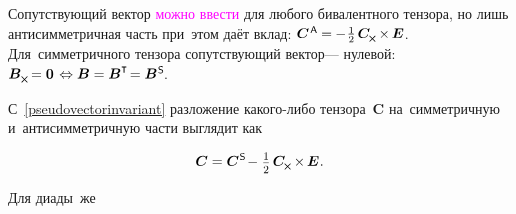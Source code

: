 \begin{otherlanguage}{russian}
\vspace{-0.6em} Сопутствующий вектор \textcolor{magenta}{можно ввести} для любого бивалентного тензора, но лишь антисимметричная часть при~этом даёт вклад: ${\bm{C}^{\hspace{.2ex}\mathsf{A}} \hspace{-0.1ex} = \hspace{-0.1ex} - \hspace{.1ex}\onehalf\hspace{.32ex} \bm{C}_{\hspace{-0.1ex}\Xcompanion} \hspace{-0.16ex} \times \hspace{-0.16ex} \bm{E}}$. Для~симметричного тензора сопутствующий вектор\:--- нулевой: ${\bm{B}_{\Xcompanion} \hspace{-0.25ex} = \bm{0} \hspace{.25ex} \Leftrightarrow \bm{B} = \bm{B}^{\T} \hspace{-0.32ex} = \bm{B}^{\mathsf{\hspace{.1ex}S}}\hspace{-0.32ex}}$.

С~\eqref{pseudovectorinvariant} разложение какого\hbox{-}либо тензора~$\bm{C}$ на~симметричную и~антисимметричную части выглядит как

\nopagebreak\vspace{-0.1em}\begin{equation}\label{symmetricantisymmetricdecompositionofsometensor}
\bm{C} = \bm{C}^{\mathsf{\hspace{.1ex}S}} \hspace{-0.32ex} - \hspace{.1ex} \smalldisplaystyleonehalf \hspace{.32ex} \bm{C}_{\hspace{-0.1ex}\Xcompanion} \hspace{-0.16ex} \times \hspace{-0.16ex} \bm{E} \hspace{.1ex} .
\end{equation}

\vspace{-0.8em}\noindent Для диады~же


\end{otherlanguage}

